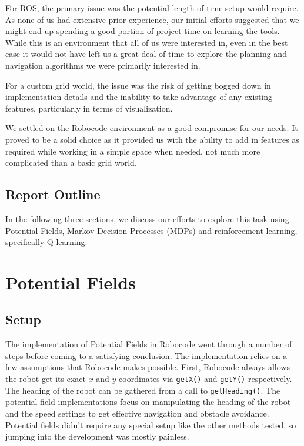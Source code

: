 \documentclass{aiaa-tc}%
\begin{document}
For ROS, the primary issue was the potential length of time setup
would require. As none of us had extensive prior experience, our
initial efforts suggested that we might end up spending a good portion
of project time on learning the tools. While this is an environment that all
of us were interested in, even in the best case it would not have left
us a great deal of time to explore the planning and navigation
algorithms we were primarily interested in.

For a custom grid world, the issue was the risk of getting bogged down
in implementation details and the inability to take advantage of any
existing features, particularly in terms of visualization.

We settled on the Robocode environment as a good compromise for our
needs. It proved to be a solid choice as it provided us with the
ability to add in features as required while working in a simple
space when needed, not much more complicated than a basic grid world.


\subsection{Report Outline}
In the following three sections, we discuss our efforts to explore
this task using Potential Fields, Markov Decision Processes (MDPs) and
reinforcement learning, specifically Q-learning.

\section{Potential Fields}
\label{Potential Fields}

\subsection{Setup}
The implementation of Potential Fields in Robocode went through a number of steps before coming to a satisfying conclusion. The implementation relies on a few assumptions that Robocode makes possible. First, Robocode always allows the robot get its exact $x$ and $y$ coordinates via \verb|getX()| and \verb|getY()| respectively. The heading of the robot can be gathered from a call to \verb|getHeading()|. The potential field implementations focus on manipulating the heading of the robot and the speed settings to get effective navigation and obstacle avoidance. Potential fields didn't require any special setup like the other methods tested, so jumping into the development was mostly painless.
\end{document}
